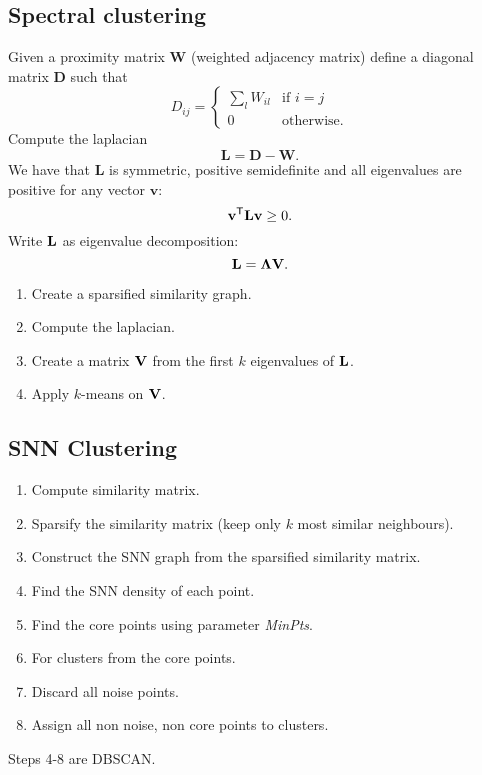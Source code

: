 \documentclass[a4paper,9pt]{extarticle}
\begin{document}
\begin{multicols*}{2}
\subsection{Spectral clustering}
Given a proximity matrix $\mathbf{W}$ (weighted adjacency matrix) define a diagonal matrix $\mathbf{D}$ such that
\begin{equation*}
	D_{ij}=\begin{cases}
		\sum_{l}W_{il}&\text{if }i=j\\
		0&\text{otherwise.}
	\end{cases}
\end{equation*}
Compute the laplacian
\begin{equation*}
	\mathbf{L}=\mathbf{D}-\mathbf{W}.
\end{equation*}
We have that $\mathbf{L}$ is symmetric, positive semidefinite and all eigenvalues are positive for any vector $\mathbf{v}$:
\begin{equation*}
	{\mathbf{v}}^{\mathsf{T}}\mathbf{L}\mathbf{v}\geq 0.
\end{equation*}
Write $\mathbf{L}$ as eigenvalue decomposition:
\begin{equation*}
	\mathbf{L}=\mathbf{\Lambda}\mathbf{V}.
\end{equation*}
\begin{riquadro}
	\begin{enumerate}
		\item Create a sparsified similarity graph.
		\item Compute the laplacian.
		\item Create a matrix $\mathbf{V}$ from the first $k$ eigenvalues of $\mathbf{L}$.
		\item Apply $k$-means on $\mathbf{V}$.
	\end{enumerate}
\end{riquadro}
\subsection{SNN Clustering}
\begin{riquadro}
	\begin{enumerate}
		\item Compute similarity matrix.
		\item Sparsify the similarity matrix (keep only $k$ most similar neighbours).
		\item Construct the SNN graph from the sparsified similarity matrix.
		\item Find the SNN density of each point.
		\item Find the core points using parameter \textit{MinPts}.
		\item For clusters from the core points.
		\item Discard all noise points.
		\item Assign all non noise, non core points to clusters.
	\end{enumerate}
	Steps 4-8 are DBSCAN.
\end{riquadro}

\end{multicols*}
\end{document}
